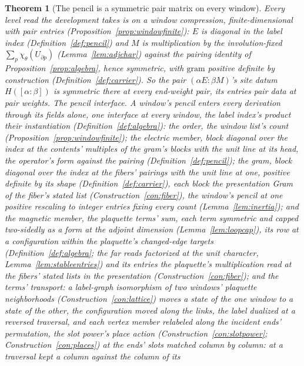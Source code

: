 \documentclass[11pt]{article}
\newtheorem{theorem}{Theorem}
\theoremstyle{definition}
\begin{document}
\begin{theorem}[The pencil is a symmetric pair matrix on every window]
\label{thm:pairpencil}
Every level read the development takes is on a window compression,
finite-dimensional with pair entries
(Proposition~\ref{prop:windowfinite}): $E$ is diagonal in the label index
(Definition~\ref{def:pencil}) and $M$ is multiplication by the involution-fixed
$\sum_p\chi_\theta(U_{\partial p})$ (Lemma~\ref{lem:adjchar}) against the
pairing identity of Proposition~\ref{prop:algebra}, hence symmetric, with
$\mathrm{gram}$ positive definite by construction
(Definition~\ref{def:carrier}). So the pair $(\alpha E:\beta M)$'s
site datum $H([\alpha\!:\!\beta])$
is symmetric there at every end-weight pair, its entries pair data at
pair weights. \emph{The pencil interface.} A window's pencil enters
every derivation through its fields alone, one interface at every
window, the label index's product their instantiation
(Definition~\ref{def:algebra}): the \emph{order}, the window list's
count (Proposition~\ref{prop:windowfinite}); the \emph{electric
member}, block diagonal over the index at the contents' multiples
of the gram's blocks with the unit line at its head, the operator's
form against the pairing (Definition~\ref{def:pencil}); the
\emph{gram}, block diagonal over the index at the fibers' pairings
with the unit line at one, positive definite by its shape
(Definition~\ref{def:carrier}), each block the presentation Gram of
the fiber's stated list (Construction~\ref{con:fiber}), the window's
pencil at one positive rescaling to integer entries fixing every
count (Lemma~\ref{lem:inertia}); and
the \emph{magnetic member}, the plaquette terms' sum, each term
symmetric and capped two-sidedly as a form at the adjoint dimension
(Lemma~\ref{lem:loopcap}), its row at a configuration within the
plaquette's changed-edge targets (Definition~\ref{def:algebra}; the
far reads factorized at the unit character,
Lemma~\ref{lem:stableentries}) and its entries the plaquette's
multiplication read at the fibers' stated lists in the presentation
(Construction~\ref{con:fiber}); and the \emph{terms' transport}: a
label-graph isomorphism of two windows' plaquette neighborhoods
(Construction~\ref{con:lattice}) moves a state of the one window
to a state of the other, the configuration moved along the links,
the label dualized at a reversed traversal, and each vertex member
relabeled along the incident ends' permutation, the slot power's
place action (Construction~\ref{con:slotpower};
Construction~\ref{con:places}) at the ends' slots matched column
by column: at a traversal kept a column against the column of its

\end{theorem}
\end{document}

